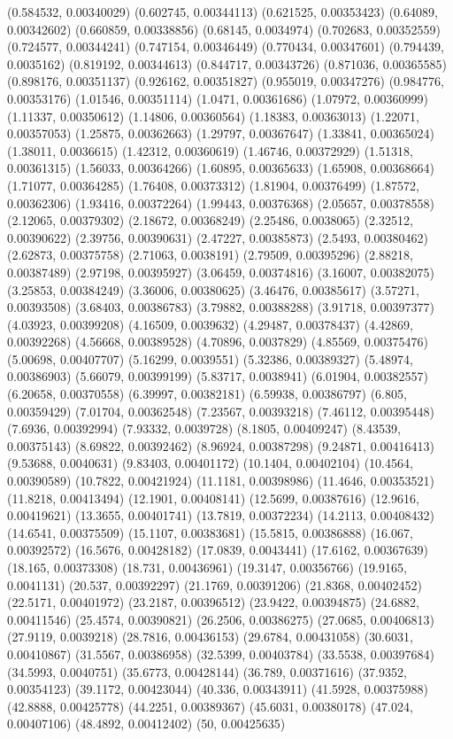 {(0.584532, 0.00340029)
(0.602745, 0.00344113)
(0.621525, 0.00353423)
(0.64089, 0.00342602)
(0.660859, 0.00338856)
(0.68145, 0.0034974)
(0.702683, 0.00352559)
(0.724577, 0.00344241)
(0.747154, 0.00346449)
(0.770434, 0.00347601)
(0.794439, 0.0035162)
(0.819192, 0.00344613)
(0.844717, 0.00343726)
(0.871036, 0.00365585)
(0.898176, 0.00351137)
(0.926162, 0.00351827)
(0.955019, 0.00347276)
(0.984776, 0.00353176)
(1.01546, 0.00351114)
(1.0471, 0.00361686)
(1.07972, 0.00360999)
(1.11337, 0.00350612)
(1.14806, 0.00360564)
(1.18383, 0.00363013)
(1.22071, 0.00357053)
(1.25875, 0.00362663)
(1.29797, 0.00367647)
(1.33841, 0.00365024)
(1.38011, 0.0036615)
(1.42312, 0.00360619)
(1.46746, 0.00372929)
(1.51318, 0.00361315)
(1.56033, 0.00364266)
(1.60895, 0.00365633)
(1.65908, 0.00368664)
(1.71077, 0.00364285)
(1.76408, 0.00373312)
(1.81904, 0.00376499)
(1.87572, 0.00362306)
(1.93416, 0.00372264)
(1.99443, 0.00376368)
(2.05657, 0.00378558)
(2.12065, 0.00379302)
(2.18672, 0.00368249)
(2.25486, 0.0038065)
(2.32512, 0.00390622)
(2.39756, 0.00390631)
(2.47227, 0.00385873)
(2.5493, 0.00380462)
(2.62873, 0.00375758)
(2.71063, 0.0038191)
(2.79509, 0.00395296)
(2.88218, 0.00387489)
(2.97198, 0.00395927)
(3.06459, 0.00374816)
(3.16007, 0.00382075)
(3.25853, 0.00384249)
(3.36006, 0.00380625)
(3.46476, 0.00385617)
(3.57271, 0.00393508)
(3.68403, 0.00386783)
(3.79882, 0.00388288)
(3.91718, 0.00397377)
(4.03923, 0.00399208)
(4.16509, 0.0039632)
(4.29487, 0.00378437)
(4.42869, 0.00392268)
(4.56668, 0.00389528)
(4.70896, 0.0037829)
(4.85569, 0.00375476)
(5.00698, 0.00407707)
(5.16299, 0.0039551)
(5.32386, 0.00389327)
(5.48974, 0.00386903)
(5.66079, 0.00399199)
(5.83717, 0.0038941)
(6.01904, 0.00382557)
(6.20658, 0.00370558)
(6.39997, 0.00382181)
(6.59938, 0.00386797)
(6.805, 0.00359429)
(7.01704, 0.00362548)
(7.23567, 0.00393218)
(7.46112, 0.00395448)
(7.6936, 0.00392994)
(7.93332, 0.0039728)
(8.1805, 0.00409247)
(8.43539, 0.00375143)
(8.69822, 0.00392462)
(8.96924, 0.00387298)
(9.24871, 0.00416413)
(9.53688, 0.0040631)
(9.83403, 0.00401172)
(10.1404, 0.00402104)
(10.4564, 0.00390589)
(10.7822, 0.00421924)
(11.1181, 0.00398986)
(11.4646, 0.00353521)
(11.8218, 0.00413494)
(12.1901, 0.00408141)
(12.5699, 0.00387616)
(12.9616, 0.00419621)
(13.3655, 0.00401741)
(13.7819, 0.00372234)
(14.2113, 0.00408432)
(14.6541, 0.00375509)
(15.1107, 0.00383681)
(15.5815, 0.00386888)
(16.067, 0.00392572)
(16.5676, 0.00428182)
(17.0839, 0.0043441)
(17.6162, 0.00367639)
(18.165, 0.00373308)
(18.731, 0.00436961)
(19.3147, 0.00356766)
(19.9165, 0.0041131)
(20.537, 0.00392297)
(21.1769, 0.00391206)
(21.8368, 0.00402452)
(22.5171, 0.00401972)
(23.2187, 0.00396512)
(23.9422, 0.00394875)
(24.6882, 0.00411546)
(25.4574, 0.00390821)
(26.2506, 0.00386275)
(27.0685, 0.00406813)
(27.9119, 0.0039218)
(28.7816, 0.00436153)
(29.6784, 0.00431058)
(30.6031, 0.00410867)
(31.5567, 0.00386958)
(32.5399, 0.00403784)
(33.5538, 0.00397684)
(34.5993, 0.0040751)
(35.6773, 0.00428144)
(36.789, 0.00371616)
(37.9352, 0.00354123)
(39.1172, 0.00423044)
(40.336, 0.00343911)
(41.5928, 0.00375988)
(42.8888, 0.00425778)
(44.2251, 0.00389367)
(45.6031, 0.00380178)
(47.024, 0.00407106)
(48.4892, 0.00412402)
(50, 0.00425635)
}


